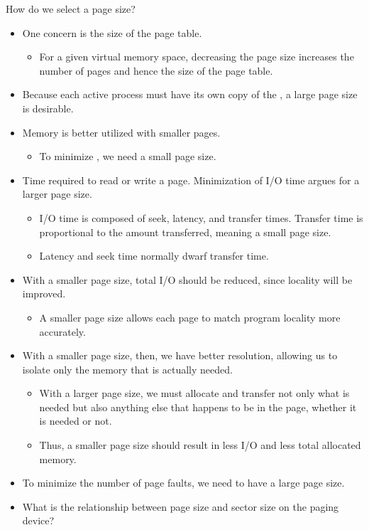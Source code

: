 How do we select a page size?
\begin{itemize}[noitemsep]
\item One concern is the size of the page table.
  \begin{itemize}[noitemsep]
  \item For a given virtual memory space, decreasing the page size increases the number of pages and hence the size of the page table.
  \end{itemize}

\item Because each active process must have its own copy of the , a large page size is desirable.

\item Memory is better utilized with smaller pages.
  \begin{itemize}[noitemsep]
  \item To minimize , we need a small page size.
  \end{itemize}

\item Time required to read or write a page.
  Minimization of I/O time argues for a larger page size.
  \begin{itemize}[noitemsep]
  \item I/O time is composed of seek, latency, and transfer times.
    Transfer time is proportional to the amount transferred, meaning a small page size.
  \item Latency and seek time normally dwarf transfer time.
  \end{itemize}

\item With a smaller page size, total I/O should be reduced, since locality will be improved.
  \begin{itemize}[noitemsep]
  \item A smaller page size allows each page to match program locality more accurately.
\end{itemize}

\item With a smaller page size, then, we have better resolution, allowing us to isolate only the memory that is actually needed.
  \begin{itemize}[noitemsep]
  \item With a larger page size, we must allocate and transfer not only what is needed but also anything else that happens to be in the page, whether it is needed or not.
  \item Thus, a smaller page size should result in less I/O and less total allocated memory.
\end{itemize}
\item To minimize the number of page faults, we need to have a large page size.

\item What is the relationship between page size and sector size on the paging device?
\end{itemize}



